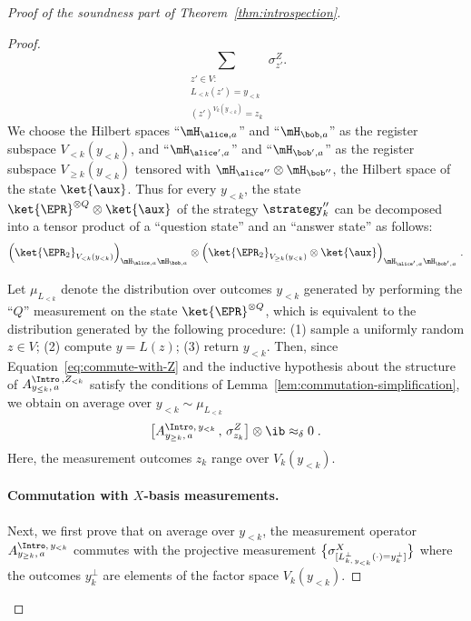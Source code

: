 \begin{proof}[Proof of the soundness part of Theorem~\ref{thm:introspection}]
\begin{proof}
    \[
    	\sum_{\substack{z' \in V: \\ L_{<k}(z') = y_{<k} \\ (z')^{V_k(y_{<k})} = z_k}} \sigma^Z_{z'}.
    \]
    We choose the Hilbert spaces ``$\mH_{\alice,a}$'' and ``$\mH_{\bob,a}$'' as
    the register subspace $ V_{<k}(y_{<k})$, and ``$\mH_{\alice',a}$'' and
    ``$\mH_{\bob',a}$'' as the register subspace $V_{\geq k}(y_{<k})$ tensored
    with $\mH_{\alice''} \otimes \mH_{\bob''}$, the Hilbert space of the state
    $\ket{\aux}$.
    Thus for every $y_{<k}$, the state $\ket{\EPR}^{\otimes Q} \otimes
    \ket{\aux}$ of the strategy $\strategy_k''$ can be decomposed into a tensor
    product of a ``question state'' and an ``answer state'' as follows:
    \[
      \Big ( \ket{\EPR_2}_{V_{<k}(y_{<k})} \Big)_{\mH_{\alice,a} \mH_{\bob,a}}
      \otimes \Big ( \ket{\EPR_2}_{V_{\geq k}(y_{<k})} \otimes \ket{\aux}
      \Big)_{\mH_{\alice',a} \mH_{\bob',a}}\;.
    \]

    Let $\mu_{L_{<k}}$ denote the distribution over outcomes $y_{< k}$ generated
    by performing the ``$Q$'' measurement on the state $\ket{\EPR}^{\otimes Q}$,
    which is equivalent to the distribution generated by the following
    procedure: (1) sample a uniformly random $z \in V$; (2) compute $y = L(z)$;
    (3) return $y_{<k}$.
    Then, since Equation~\eqref{eq:commute-with-Z} and the inductive hypothesis
    about the structure of $A^{\Intro\,,Z_{<k}}_{y_{\leq k},\,a}$ satisfy the
    conditions of Lemma~\ref{lem:commutation-simplification}, we obtain on
    average over $y_{< k} \sim \mu_{L_{< k}}$
    \begin{equation}
      \label{eq:intro-sound-5}
      \bigl[ \aigek \,,\, \z[z_k] \bigr] \otimes \ib \approx_\delta 0 \;.
    \end{equation}
    Here, the measurement outcomes $z_k$ range over $V_k(y_{<k})$.

    \paragraph{Commutation with $X$-basis measurements.}
    Next, we first prove that on average over $y_{< k}$, the measurement
    operator $\aigek$ commutes with the projective measurement
    $\bigl\{ \sigma^{X}_{[L_{k,\, y_{<k}}^\perp (\cdot) = y_{k}^\perp]} \bigr\}$ where the
    outcomes $y_k^\perp$ are elements of the factor space $V_k(y_{<k})$.
  

\end{proof}
\end{proof}
